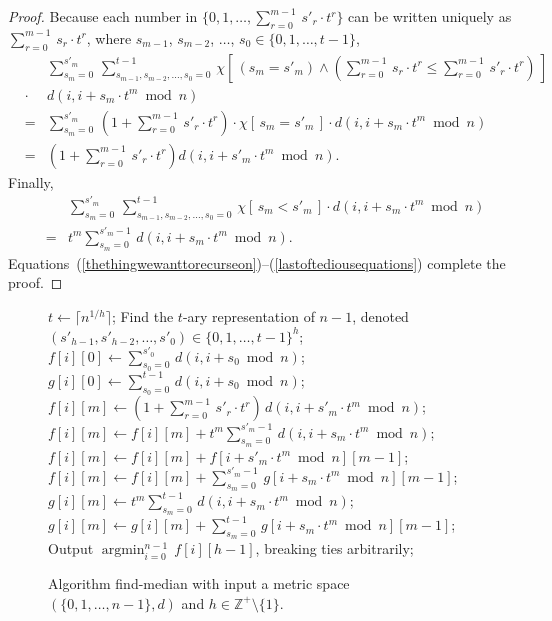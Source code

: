 \documentclass[letterpaper,12pt]{article}
\begin{document}
\begin{proof}
{}
Because each number in $\{0,1,\ldots,\sum_{r=0}^{m-1}\,s'_r\cdot t^r\}$
can be written
uniquely
as
$\sum_{r=0}^{m-1}\,s_r\cdot t^r$,
where $s_{m-1}$, $s_{m-2}$, $\ldots$, $s_0\in\{0,1,\ldots,t-1\}$,
\begin{eqnarray}
&&\sum_{s_m=0}^{s'_m}\,
\sum_{s_{m-1},s_{m-2},\ldots,s_0=0}^{t-1}\,
\chi\left[\,\left(s_m=s'_m\right)\land
\left(\sum_{r=0}^{m-1}\,s_r\cdot t^r \le \sum_{r=0}^{m-1}\, s'_r\cdot t^r
\right)
\,\right]\nonumber\\
&\cdot&
d\left(i,i+s_m\cdot t^m\bmod{n}\right)\nonumber\\
&=&
\sum_{s_m=0}^{s'_m}\,
\left(1+\sum_{r=0}^{m-1}\, s'_r\cdot t^r\right)
\cdot
\chi\left[\,s_m=s'_m\,\right]
\cdot d\left(i,i+s_m\cdot t^m\bmod{n}\right)\nonumber\\
&=&
\left(1+\sum_{r=0}^{m-1}\, s'_r\cdot t^r\right)
d\left(i,i+s'_m\cdot t^m\bmod{n}\right).
\nonumber
\end{eqnarray}
Finally,
\begin{eqnarray}
&&\sum_{s_m=0}^{s'_m}\,
\sum_{s_{m-1},s_{m-2},\ldots,s_0=0}^{t-1}\,
\chi\left[\,s_m<s'_m
\,\right]
\cdot d\left(i,i+s_m\cdot t^m\bmod{n}
\right)\nonumber\\
&=& t^m \sum_{s_m=0}^{s'_m-1}\, d\left(i,i+s_m\cdot
t^m\bmod{n}
\right).
\label{lastoftediousequations}
\end{eqnarray}
Equations~(\ref{thethingwewanttorecurseon})--(\ref{lastoftediousequations})
complete the proof.
\end{proof}



\begin{figure}
\begin{algorithmic}[1]
\STATE $t\leftarrow\lceil n^{1/h}\rceil$;
\STATE Find
the $t$-ary representation
of $n-1$, denoted
$(s'_{h-1},s'_{h-2},\ldots,s'_0)\in\{0,1,\ldots,t-1\}^h$;
  \STATE $f[i][0]\leftarrow \sum_{s_0=0}^{s'_0}\, d(i,i+s_0\bmod{n})$;
  \STATE $g[i][0]\leftarrow \sum_{s_0=0}^{t-1}\, d(i,i+s_0\bmod{n})$;
\ENDFOR
{}
    \STATE $f[i][m]\leftarrow (1+\sum_{r=0}^{m-1}\,s'_r\cdot t^r)\,
d(i,i+s'_m\cdot t^m\bmod{n})$;
    \STATE $f[i][m]\leftarrow f[i][m]+t^m\sum_{s_m=0}^{s'_m-1}\,
d(i,i+s_m\cdot t^m\bmod{n})$;
\STATE $f[i][m]\leftarrow f[i][m]+f[i+s'_m\cdot t^m\bmod{n}][m-1]$;
    \STATE $f[i][m]\leftarrow f[i][m]+\sum_{s_m=0}^{s'_m-1}\,
g[i+s_m\cdot t^m\bmod{n}][m-1]$;
    \STATE $g[i][m]\leftarrow t^m\sum_{s_m=0}^{t-1}\,
d(i,i+s_m\cdot t^m\bmod{n})$;
    \STATE $g[i][m]\leftarrow g[i][m]+\sum_{s_m=0}^{t-1}\,
g[i+s_m\cdot t^m\bmod{n}][m-1]$;
  \ENDFOR
\ENDFOR
\STATE Output $\mathop{\mathrm{argmin}}_{i=0}^{n-1}\, f[i][h-1]$,
breaking ties arbitrarily;
\end{algorithmic}
\caption{Algorithm {\sf find-median} with input
a
metric space $(\{0,1,\ldots,n-1\},d)$ and $h\in\mathbb{Z}^+\setminus\{1\}$.}
\label{mainalgorithm}
\end{figure}
\end{document}
